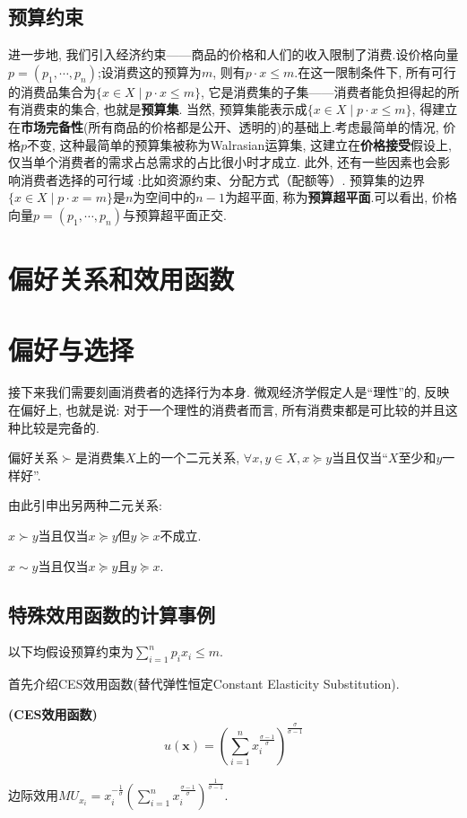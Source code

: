 \documentclass[lang=cn,10pt]{elegantbook}
\begin{document}
\subsection{预算约束}
进一步地, 我们引入经济约束——商品的价格和人们的收入限制了消费.设价格向量$p=(p_1,\cdots,p_n)$;设消费这的预算为$m$, 则有$p\cdot x\leq m$.在这一限制条件下, 所有可行的消费品集合为$\{x\in X\mid p\cdot x\leq m\}$, 它是消费集的子集——消费者能负担得起的所有消费束的集合, 也就是\textbf{预算集}.
当然, 预算集能表示成$\{x\in X\mid p\cdot x\leq m\}$, 得建立在\textbf{市场完备性}(所有商品的价格都是公开、透明的)的基础上.考虑最简单的情况, 价格$p$不变, 这种最简单的预算集被称为Walrasian运算集, 这建立在\textbf{价格接受}假设上, 仅当单个消费者的需求占总需求的占比很小时才成立.
此外, 还有一些因素也会影响消费者选择的可行域 :比如资源约束、分配方式（配额等）.
预算集的边界$\{x\in X\mid p\cdot x=m\}$是$n$为空间中的$n-1$为超平面, 称为\textbf{预算超平面}.可以看出, 价格向量$p=(p_1,\cdots,p_n)$与预算超平面正交.
\newpage
\section{偏好关系和效用函数}
\section{偏好与选择}
接下来我们需要刻画消费者的选择行为本身. 微观经济学假定人是“理性”的, 反映在偏好上, 也就是说: 对于一个理性的消费者而言, 所有消费束都是可比较的并且这种比较是完备的.
\begin{definition}
偏好关系$\succ$是消费集$X$上的一个二元关系, $\forall x,y\in X,x\succeq y$当且仅当“$X$至少和$y$一样好”.
\end{definition}
由此引申出另两种二元关系:
\begin{definition}[严格偏好关系]
    $x\succ y$当且仅当$x\succeq y$但$y\succeq x$不成立.
\end{definition}
\begin{definition}[无差异关系]
    $x\sim y$当且仅当$x\succeq y$且$y\succeq x$.
\end{definition}
\subsection{特殊效用函数的计算事例}
以下均假设预算约束为$\sum_{i=1}^{n}p_ix_i\leq m$.

首先介绍CES效用函数(替代弹性恒定Constant Elasticity Substitution).
\begin{example}{\textbf{(CES效用函数)}}{}
    $$u(\textbf{x})=\left(\sum_{i=1}^{n}x_{i}^{\frac{\sigma-1}{\sigma}}\right)^{\frac{\sigma}{\sigma-1}}$$
\end{example}
边际效用$MU_{x_i}=x_i^{-\frac{1}{\sigma}}\left(\sum_{i=1}^{n}x_{i}^{\frac{\sigma-1}{\sigma}}\right)^{\frac{1}{\sigma-1}}$.
\end{document}
